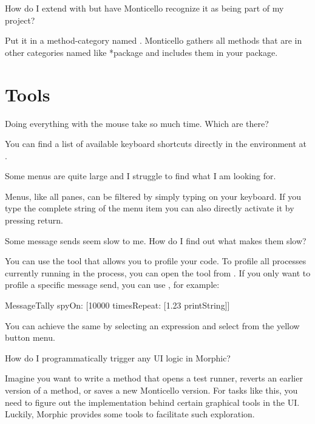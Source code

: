 \documentclass[a4paper,10pt,twoside]{book}
\begin{document}
{\begin{faq}
How do I extend  with  but have Monticello recognize it as being part of my  project?
\end{faq}
\answer
Put it in a method-category named .
Monticello gathers all methods that are in other categories named like *package and includes them in your package.

\section{Tools}

\begin{faq}
Doing everything with the mouse take so much time.
Which  are there?
\end{faq}
\answer
You can find a list of available keyboard shortcuts directly in the environment at .

\begin{faq}
Some menus are quite large and I struggle to find what I am looking for.
\end{faq}
\answer
Menus, like all panes, can be filtered by simply typing on your keyboard.
If you type the complete string of the menu item you can also directly activate it by pressing return.

\begin{faq}
Some message sends seem slow to me.
How do I find out what makes them slow?
\end{faq}
\answer
You can use the  tool that allows you to profile your code.
To profile all processes currently running in the process, you can open the tool from .
If you only want to profile a specific message send, you can use , for example:
\begin{code}{}
MessageTally spyOn: [10000 timesRepeat: [1.23 printString]]
\end{code}
You can achieve the same by selecting an expression and select  from the yellow button menu.

\begin{faq}
How do I programmatically trigger any UI logic in Morphic?
\end{faq}
\answer
Imagine you want to write a method that opens a test runner, reverts an earlier version of a method, or saves a new Monticello version.
For tasks like this, you need to figure out the implementation behind certain graphical tools in the UI.
Luckily, Morphic provides some tools to facilitate such exploration.

}
\end{document}
